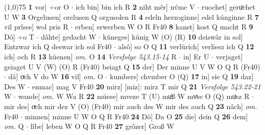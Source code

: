 \documentclass[8pt,a4paper,notitlepage]{article}
\begin{document}
\begin{table}[ht]
\begin{minipage}[t]{0.5\linewidth}
\line(1,0){75} \newline
\textbf{1} vor] ÷or O  $\cdot$ ich bin] bin ich R \textbf{2} niht mêr] nv́me V  $\cdot$ ruochet] geruͦchet U W \textbf{3} Orgelusen] orelusen Q orgusolen R \textbf{4} edeln herzoginne] edel kúnginne R \textbf{7} vil prîses] wol pris R  $\cdot$ erben] erwerben W O R Fr40 \textbf{8} kanst] kost Q macht R \textbf{9} Dô] ÷o T  $\cdot$ dâhte] gedacht W  $\cdot$ küneges] kúnig W (O) (R) \textbf{10} deiswâr in sol] Entzwar ich Q deswar ich sol Fr40  $\cdot$ alsô] so O Q \textbf{11} verlürich] verliesz ich Q \textbf{12} ich] och R \textbf{13} küenen] \textit{om.} O \textbf{14} \textit{Versfolge 543.15-14} R   $\cdot$ in] Er U  $\cdot$ verjaget] geiaget U V (W) (O) R (Fr40) beiagt Q \textbf{15} der] Der minne U V W O Q R (Fr40)  $\cdot$ dâ] oͮch V do W \textbf{16} vil] \textit{om.} O  $\cdot$ kumbers] chvmber O (Q) \textbf{17} in] sie Q \textbf{19} daz] Des W  $\cdot$ enmac] mag V Fr40 \textbf{20} mirz] [miz]: mirz T mir Q \textbf{21} \textit{Versfolge 543.22-21} W   $\cdot$ wande] \textit{om.} W Wa R \textbf{22} müese] mveze T (U) muͤß W mvͦse O (Q) muͯsz R  $\cdot$ mir des] oͮch mir dez V (O) (Fr40) mir auch des W mir des auch Q \textbf{23} nâch] \textit{om.} Fr40  $\cdot$ minnen] minne U W O Q R Fr40 \textbf{24} Dô] Da O \textbf{25} die] dein Q \textbf{26} dem] \textit{om.} Q  $\cdot$ lîbe] leben W O Q R Fr40 \textbf{27} grôzer] Groß W \newline
\end{minipage}
\end{table}
\end{document}
